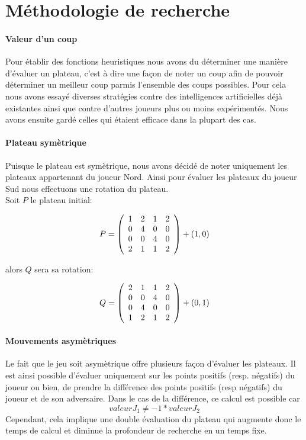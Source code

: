 \section{Méthodologie de recherche}

	\paragraph{Valeur d'un coup} Pour établir des fonctions heuristiques nous avons du déterminer
	une manière d'évaluer un plateau, c'est à dire une façon de noter un coup afin de pouvoir déterminer
	un meilleur coup parmis l'ensemble des coups possibles. Pour cela nous avons essayé diverses stratégies contre
	des intelligences artificielles déjà existantes ainsi que contre d'autres joueurs plus ou moins expérimentés.
	Nous avons ensuite gardé celles qui étaient efficace dans la plupart des cas.

	\paragraph{Plateau symètrique} Puisque le plateau est symètrique, nous avons décidé de noter uniquement les plateaux
	appartenant du joueur Nord. Ainsi pour évaluer les plateaux du joueur Sud nous effectuons une rotation du plateau.\\

	Soit $P$ le plateau initial:

	\[
		P = \left(
			\begin{array}{ c c c c }
				1 & 2 & 1 & 2\\
				0 & 4 & 0 & 0\\
				0 & 0 & 4 & 0\\
				2 & 1 & 1 & 2\\
			\end{array}
			\right)
			+
			\left(
			1, 0
			\right)
	\]

	\newpage
	alors $Q$ sera sa rotation:

	\[
		Q = \left(
			\begin{array}{ c c c c }
				2 & 1 & 1 & 2\\
				0 & 0 & 4 & 0\\
				0 & 4 & 0 & 0\\
				1 & 2 & 1 & 2\\
			\end{array}
			\right)
			+
			\left(
			0, 1
			\right)
	\]

	\paragraph{Mouvements asymètriques} Le fait que le jeu soit asymètrique offre plusieurs façon d'évaluer les plateaux.
	Il est ainsi possible d'évaluer uniquement sur les points positifs (resp. négatifs) du joueur ou bien,
	de prendre la différence des points positifs (resp négatifs) du joueur et de son adversaire. Dans le cas
	de la différence, ce calcul est possible car \[valeurJ_{1} \neq -1*valeurJ_{2}\] Cependant, cela implique une double
	évaluation du plateau qui augmente donc le temps de calcul et diminue la profondeur de recherche en un temps fixe.
